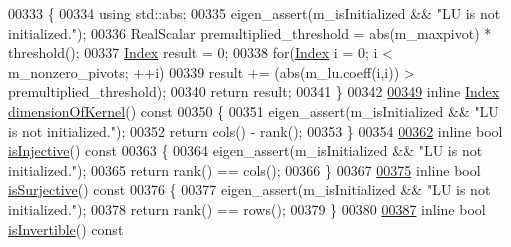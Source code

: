 \begin{DoxyCode}
00333 \textcolor{keyword}{    }\{
00334       \textcolor{keyword}{using} std::abs;
00335       eigen\_assert(m\_isInitialized && \textcolor{stringliteral}{"LU is not initialized."});
00336       RealScalar premultiplied\_threshold = abs(m\_maxpivot) * threshold();
00337       \hyperlink{group___core___module_a554f30542cc2316add4b1ea0a492ff02}{Index} result = 0;
00338       \textcolor{keywordflow}{for}(\hyperlink{group___core___module_a554f30542cc2316add4b1ea0a492ff02}{Index} i = 0; i < m\_nonzero\_pivots; ++i)
00339         result += (abs(m\_lu.coeff(i,i)) > premultiplied\_threshold);
00340       \textcolor{keywordflow}{return} result;
00341     \}
00342 
\hyperlink{group___l_u___module_a64e191225834e91161ea53ad4b78167b}{00349}     \textcolor{keyword}{inline} \hyperlink{group___core___module_a554f30542cc2316add4b1ea0a492ff02}{Index} \hyperlink{group___l_u___module_a64e191225834e91161ea53ad4b78167b}{dimensionOfKernel}()\textcolor{keyword}{ const}
00350 \textcolor{keyword}{    }\{
00351       eigen\_assert(m\_isInitialized && \textcolor{stringliteral}{"LU is not initialized."});
00352       \textcolor{keywordflow}{return} cols() - rank();
00353     \}
00354 
\hyperlink{group___l_u___module_ab13992c852aa593461d9b81790b56667}{00362}     \textcolor{keyword}{inline} \textcolor{keywordtype}{bool} \hyperlink{group___l_u___module_ab13992c852aa593461d9b81790b56667}{isInjective}()\textcolor{keyword}{ const}
00363 \textcolor{keyword}{    }\{
00364       eigen\_assert(m\_isInitialized && \textcolor{stringliteral}{"LU is not initialized."});
00365       \textcolor{keywordflow}{return} rank() == cols();
00366     \}
00367 
\hyperlink{group___l_u___module_a1f6222875fc3a181ee1544b9b36dfda5}{00375}     \textcolor{keyword}{inline} \textcolor{keywordtype}{bool} \hyperlink{group___l_u___module_a1f6222875fc3a181ee1544b9b36dfda5}{isSurjective}()\textcolor{keyword}{ const}
00376 \textcolor{keyword}{    }\{
00377       eigen\_assert(m\_isInitialized && \textcolor{stringliteral}{"LU is not initialized."});
00378       \textcolor{keywordflow}{return} rank() == rows();
00379     \}
00380 
\hyperlink{group___l_u___module_afdf2579c93473650f2ef2a47a376c4a0}{00387}     \textcolor{keyword}{inline} \textcolor{keywordtype}{bool} \hyperlink{group___l_u___module_afdf2579c93473650f2ef2a47a376c4a0}{isInvertible}()\textcolor{keyword}{ const}

\end{DoxyCode}
